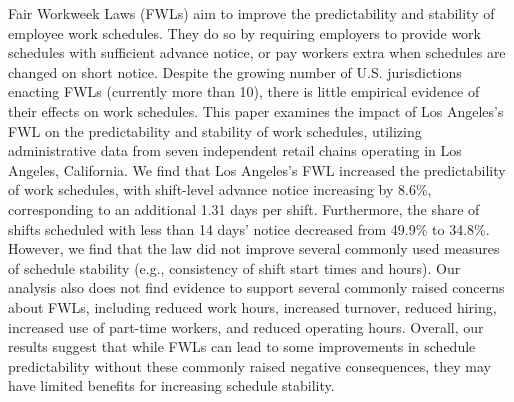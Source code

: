 \documentclass[letterpaper,11pt,leqno]{article}
\theoremstyle{paper}
\begin{document}
\begin{titlepage}\maketitle


\noindent
\begin{singlespace}
Fair Workweek Laws (FWLs) aim to improve the predictability and stability of employee work schedules. They do so by requiring employers to provide work schedules with sufficient advance notice, or pay workers extra when schedules are changed on short notice. Despite the growing number of U.S. jurisdictions enacting FWLs (currently more than 10), there is little empirical evidence of their effects on work schedules. This paper examines the impact of Los Angeles's FWL on the predictability and stability of work schedules, utilizing administrative data from seven independent retail chains operating in Los Angeles, California. We find that Los Angeles's FWL increased the predictability of work schedules, with shift-level advance notice increasing by 8.6\%, corresponding to an additional 1.31 days per shift. Furthermore, the share of shifts scheduled with less than 14 days' notice decreased from 49.9\% to 34.8\%. However, we find that the law did not improve several commonly used measures of schedule stability (e.g., consistency of shift start times and hours). Our analysis also does not find evidence to support several commonly raised concerns about FWLs, including reduced work hours, increased turnover, reduced hiring, increased use of part-time workers, and reduced operating hours. Overall, our results suggest that while FWLs can lead to some improvements in schedule predictability without these commonly raised negative consequences, they may have limited benefits for increasing schedule stability.



    
\end{singlespace}




\end{titlepage}
\end{document}
